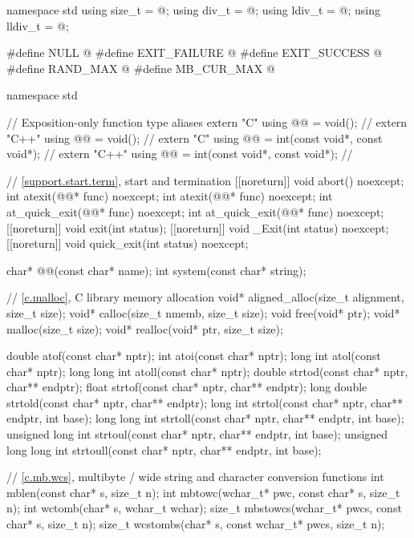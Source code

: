 \begin{codeblock}
namespace std {
  using size_t = @\seebelow@;
  using div_t = @\seebelow@;
  using ldiv_t = @\seebelow@;
  using lldiv_t = @\seebelow@;
}

#define NULL @\seebelow@
#define EXIT_FAILURE @\seebelow@
#define EXIT_SUCCESS @\seebelow@
#define RAND_MAX @\seebelow@
#define MB_CUR_MAX @\seebelow@

namespace std {
  // Exposition-only function type aliases
  extern "C" using @@ = void();                        // \expos
  extern "C++" using @@ = void();                        // \expos
  extern "C" using @@ = int(const void*, const void*);   // \expos
  extern "C++" using @@ = int(const void*, const void*);   // \expos

  // \ref{support.start.term}, start and termination
  [[noreturn]] void abort() noexcept;
  int atexit(@@* func) noexcept;
  int atexit(@@* func) noexcept;
  int at_quick_exit(@@* func) noexcept;
  int at_quick_exit(@@* func) noexcept;
  [[noreturn]] void exit(int status);
  [[noreturn]] void _Exit(int status) noexcept;
  [[noreturn]] void quick_exit(int status) noexcept;

  char* @@(const char* name);
  int system(const char* string);

  // \ref{c.malloc}, C library memory allocation
  void* aligned_alloc(size_t alignment, size_t size);
  void* calloc(size_t nmemb, size_t size);
  void free(void* ptr);
  void* malloc(size_t size);
  void* realloc(void* ptr, size_t size);

  double atof(const char* nptr);
  int atoi(const char* nptr);
  long int atol(const char* nptr);
  long long int atoll(const char* nptr);
  double strtod(const char* nptr, char** endptr);
  float strtof(const char* nptr, char** endptr);
  long double strtold(const char* nptr, char** endptr);
  long int strtol(const char* nptr, char** endptr, int base);
  long long int strtoll(const char* nptr, char** endptr, int base);
  unsigned long int strtoul(const char* nptr, char** endptr, int base);
  unsigned long long int strtoull(const char* nptr, char** endptr, int base);

  // \ref{c.mb.wcs}, multibyte / wide string and character conversion functions
  int mblen(const char* s, size_t n);
  int mbtowc(wchar_t* pwc, const char* s, size_t n);
  int wctomb(char* s, wchar_t wchar);
  size_t mbstowcs(wchar_t* pwcs, const char* s, size_t n);
  size_t wcstombs(char* s, const wchar_t* pwcs, size_t n);

}
\end{codeblock}
